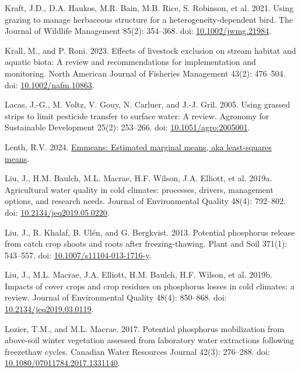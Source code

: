 \documentclass[
]{agujournal2019}
\newlength{\cslhangindent}
\newenvironment{CSLReferences}[2] %
 {\begin{list}{}{%
  \setlength{\itemindent}{0pt}
  \setlength{\leftmargin}{0pt}
  \setlength{\parsep}{0pt}
  \ifodd #1
   \setlength{\leftmargin}{\cslhangindent}
   \setlength{\itemindent}{-1\cslhangindent}
  \fi
  \setlength{\itemsep}{#2\baselineskip}}}
 {\end{list}}
\begin{document}
\begin{CSLReferences}{1}{1}
Kraft, J.D., D.A. Haukos, M.R. Bain, M.B. Rice, S. Robinson, et al.
2021. Using grazing to manage herbaceous structure for a
heterogeneity-dependent bird. The Journal of Wildlife Management 85(2):
354--368. doi:
\href{https://doi.org/10.1002/jwmg.21984}{10.1002/jwmg.21984}.

Krall, M., and P. Roni. 2023. Effects of livestock exclusion on stream
habitat and aquatic biota: A review and recommendations for
implementation and monitoring. North American Journal of Fisheries
Management 43(2): 476--504. doi:
\href{https://doi.org/10.1002/nafm.10863}{10.1002/nafm.10863}.

Lacas, J.-G., M. Voltz, V. Gouy, N. Carluer, and J.-J. Gril. 2005. Using
grassed strips to limit pesticide transfer to surface water: A review.
Agronomy for Sustainable Development 25(2): 253--266. doi:
\href{https://doi.org/10.1051/agro:2005001}{10.1051/agro:2005001}.

Lenth, R.V. 2024.
\href{https://CRAN.R-project.org/package=emmeans}{Emmeans: Estimated
marginal means, aka least-squares means}.

Liu, J., H.M. Baulch, M.L. Macrae, H.F. Wilson, J.A. Elliott, et al.
2019a. Agricultural water quality in cold climates: processes, drivers,
management options, and research needs. Journal of Environmental Quality
48(4): 792--802. doi:
\href{https://doi.org/10.2134/jeq2019.05.0220}{10.2134/jeq2019.05.0220}.

Liu, J., R. Khalaf, B. Ulén, and G. Bergkvist. 2013. Potential
phosphorus release from catch crop shoots and roots after
freezing-thawing. Plant and Soil 371(1): 543--557. doi:
\href{https://doi.org/10.1007/s11104-013-1716-y}{10.1007/s11104-013-1716-y}.

Liu, J., M.L. Macrae, J.A. Elliott, H.M. Baulch, H.F. Wilson, et al.
2019b. Impacts of cover crops and crop residues on phosphorus losses in
cold climates: a review. Journal of Environmental Quality 48(4):
850--868. doi:
\href{https://doi.org/10.2134/jeq2019.03.0119}{10.2134/jeq2019.03.0119}.

Lozier, T.M., and M.L. Macrae. 2017. Potential phosphorus mobilization
from above-soil winter vegetation assessed from laboratory water
extractions following freeze{\textendash}thaw cycles. Canadian Water
Resources Journal 42(3): 276--288. doi:
\href{https://doi.org/10.1080/07011784.2017.1331140}{10.1080/07011784.2017.1331140}.


\end{CSLReferences}
\end{document}
